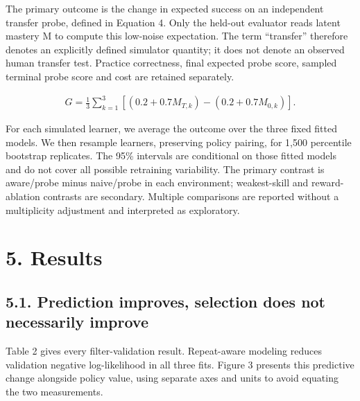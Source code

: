 \documentclass[preprint,11pt,authoryear]{elsarticle}
\begin{document}
The primary outcome is the change in expected success on an independent transfer probe, defined in Equation 4. Only the held-out evaluator reads latent mastery M to compute this low-noise expectation. The term “transfer” therefore denotes an explicitly defined simulator quantity; it does not denote an observed human transfer test. Practice correctness, final expected probe score, sampled terminal probe score and cost are retained separately.

\begin{equation}\begin{gathered}G=\frac{1}{3}\sum_{k=1}^{3}[(0.2+0.7M_{T,k})-(0.2+0.7M_{0,k})].\end{gathered}\tag{4}\end{equation}

For each simulated learner, we average the outcome over the three fixed fitted models. We then resample learners, preserving policy pairing, for 1,500 percentile bootstrap replicates. The 95\% intervals are conditional on those fitted models and do not cover all possible retraining variability. The primary contrast is aware/probe minus naive/probe in each environment; weakest-skill and reward-ablation contrasts are secondary. Multiple comparisons are reported without a multiplicity adjustment and interpreted as exploratory.

\section*{5. Results}

\subsection*{5.1. Prediction improves, selection does not necessarily improve}

Table 2 gives every filter-validation result. Repeat-aware modeling reduces validation negative log-likelihood in all three fits. Figure 3 presents this predictive change alongside policy value, using separate axes and units to avoid equating the two measurements.

\begingroup\small\setlength{\tabcolsep}{3pt}
\end{document}
